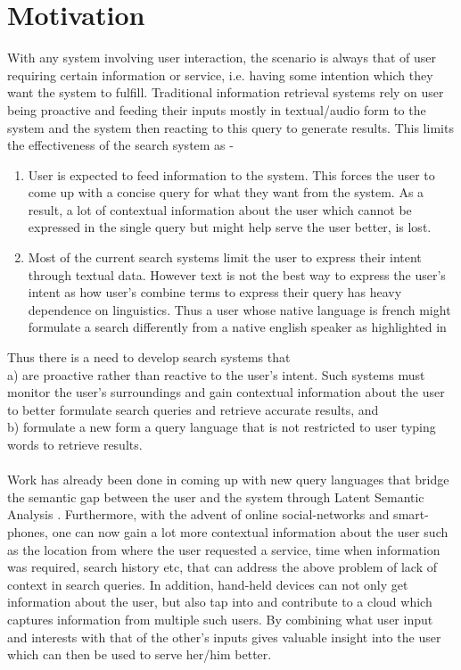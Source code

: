 \documentclass[12pt,letterpaper]{article}
\begin{document}
\section{Motivation}
With any system involving user interaction, the scenario is always that of user requiring certain information or service, i.e. having some intention which they want the system to fulfill. Traditional information retrieval systems rely on user being proactive and feeding their inputs mostly in textual/audio form to the system and the system then reacting to this query to generate results. This limits the effectiveness of the search system as -
\begin{enumerate}
  \item User is expected to feed information to the system. This forces the user to come up with a concise query for what they want from the system. As a result, a lot of contextual information about the user which cannot be expressed in the single query but might help serve the user better, is lost.
  \item Most of the current search systems limit the user to express their intent through textual data. However text is not the best way to express the user’s intent as how user’s combine terms to express their query has heavy dependence on linguistics. Thus a user whose native language is french might formulate a search differently from a native english speaker as highlighted in \cite{languagegap}
\end{enumerate}

Thus there is a need to develop search systems that\\
a) are proactive rather than reactive to the user’s intent. Such systems must monitor the user’s surroundings and gain contextual information about the user to better formulate search queries and retrieve accurate results, and\\
b) formulate a new form a query language that is not restricted to user typing words to retrieve results.
\\\\
Work has already been done in coming up with new query languages that bridge the semantic gap between the user and the system through Latent Semantic Analysis \cite{lsa}. Furthermore, with the advent of online social-networks and smart-phones, one can now gain a lot more contextual information about the user such as the location from where the user requested a service, time when information was required, search history etc, that can address the above problem of lack of context in search queries. In addition, hand-held devices can not only get information about the user, but also tap into and contribute to a cloud which captures information from multiple such users. By combining what user input and interests with that of the other’s inputs gives valuable insight into the user which can then be used to serve her/him better.
\end{document}
